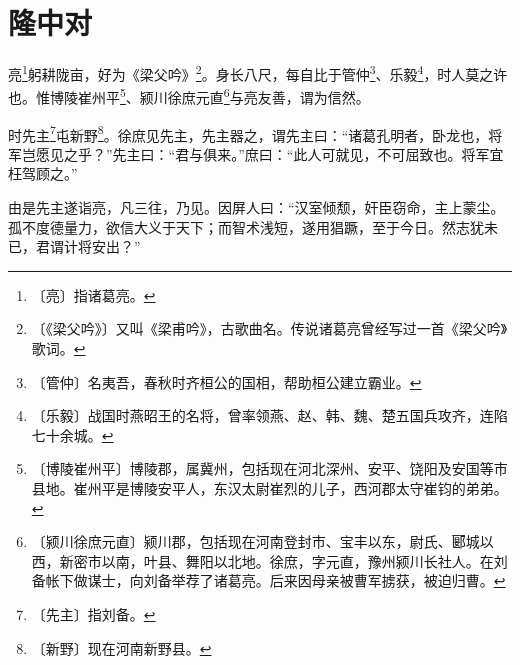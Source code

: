 \documentclass[12pt,UTF-8,openany,a4]{ctexbook}
\begin{document}
\chapter{隆中对}

\begin{large}
    
    亮\footnote{〔亮〕\yiwen \yiwen 指诸葛亮。}躬耕陇亩，好为《梁父吟》\footnote{〔《梁父吟》〕\yiwen 又叫《梁甫吟》，古歌曲名。传说诸葛亮曾经写过一首《梁父吟》歌词。}。身长八尺，每自比于管仲\footnote{〔管仲〕\yiwen 名夷吾，春秋时齐桓公的国相，帮助桓公建立霸业。}、乐毅\footnote{〔乐毅〕\yiwen 战国时燕昭王的名将，曾率领燕、赵、韩、魏、楚五国兵攻齐，连陷七十余城。}，时人莫之许也。惟博陵崔州平\footnote{〔博陵崔州平〕\yiwen 博陵郡，属冀州，包括现在河北深州、安平、饶阳及安国等市县地。崔州平是博陵安平人，东汉太尉崔烈的儿子，西河郡太守崔钧的弟弟。}、颍川徐庶元直\footnote{〔颍川徐庶元直〕\yiwen 颍川郡，包括现在河南登封市、宝丰以东，尉氏、郾城以西，新密市以南，叶县、舞阳以北地。徐庶，字元直，豫州颍川长社人。在刘备帐下做谋士，向刘备举荐了诸葛亮。后来因母亲被曹军掳获，被迫归曹。}与亮友善，谓为信然。
    
    时先主\footnote{〔先主〕\yiwen 指刘备。}屯新野\footnote{〔新野〕\yiwen 现在河南新野县。}。徐庶见先主，先主器之，谓先主曰：“诸葛孔明者，卧龙也，将军岂愿见之乎？”先主曰：“君与俱来。”庶曰：“此人可就见，不可屈致也。将军宜枉驾顾之。”
    
    由是先主遂诣亮，凡三往，乃见。因屏人曰：“汉室倾颓，奸臣窃命，主上蒙尘。孤不度德量力，欲信大义于天下；而智术浅短，遂用猖蹶，至于今日。然志犹未已，君谓计将安出？”
    

\end{large}
\end{document}
